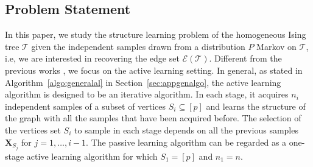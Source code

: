 \documentclass[11pt,onecolumn]{article}
\newcommand{\calE}{\mathcal{E}}
\newcommand{\calT}{\mathcal{T}}
\newcommand{\bX}{\mathbf{X}}
\begin{document}
\subsection{Problem Statement}
In this paper, we study the structure learning problem of the homogeneous Ising tree $\calT$ given the independent samples drawn from a distribution $P$ Markov on $\calT$, i.e, we are interested in recovering the edge set $\calE(\calT)$. Different from the 
previous works \cite{chow1968approximating,tan2011large}, we focus on the active learning setting. In general, as stated in Algorithm~\ref{algo:generalal} in Section~\ref{sec:appgenalgo}, the active learning algorithm is designed to be an iterative algorithm. In each stage, it acquires $n_{i}$ independent samples of a subset 
of vertices $S_{i}\subseteq [p]$ and learns the structure of the graph with all the samples that have been acquired before. The selection of the vertices set $S_{i}$ to sample in each stage depends on all the 
previous samples $\bX_{S_{j}}$ for $j=1,\ldots,i-1$. The passive learning algorithm can be regarded as a one-stage active learning algorithm for which $S_{1}=[p]$ and $n_{1}=n$.
\end{document}
